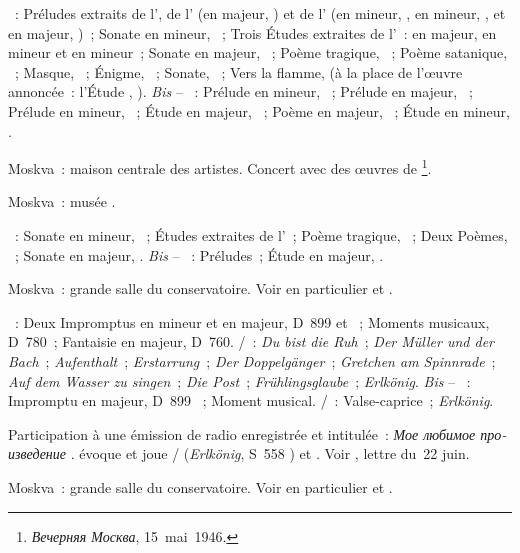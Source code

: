 \begin{description}
 \textsc{\Scriabine{}}~: Préludes extraits de l', de l'
 (en \kF \Sharp majeur, ) et de l' (en \kF mineur,
 , en \kB \Flat mineur, , et en \kD \Flat majeur,
 )~; Sonate en \kF \Sharp mineur, ~; Trois Études
 extraites de l'~:  en \kB majeur,  en \kB \Flat
 mineur et  en \kG \Sharp mineur~; Sonate en \kF \Sharp majeur,
 ~; Poème tragique, ~; Poème satanique, ~;
 Masque,  ~; Énigme,  ~; Sonate,
 ~; Vers la flamme,  (à la place de l'œuvre annoncée~:
 l'\hbox{Étude} ,  ).
 \emph{Bis} -- \textsc{\Scriabine{}}~: Prélude en \kG mineur, 
 ~; Prélude en \kE \Flat majeur,  ~; Prélude
 en \kE \Flat mineur,  ~; Étude en \kD \Flat majeur,
  ~; Poème en \kF \Sharp majeur,  ~;
 Étude en \kD \Sharp mineur,  .
 \item[\DateWithWeekDay{1946-05-17}]
 Moskva~: maison centrale des artistes.
 Concert avec des œuvres de \Scriabine{}%
 \footnote{\foreignlanguage{russian}{\emph{Вечерняя Москва}}, 15~mai~1946.}.
 \item[\DateWithWeekDay{1946-05-19}]
 Moskva~: musée \Scriabine{}.

 \textsc{\Scriabine{}}~: Sonate en \kF \Sharp mineur, ~; Études
 extraites de l'~; Poème tragique, ~; Deux Poèmes,
 ~; Sonate en \kF \Sharp majeur, .
 \emph{Bis} -- \textsc{\Scriabine{}}~: Préludes~; Étude en \kD \Flat majeur,
  .
 \item[\DateWithWeekDay{1946-05-23}]
 Moskva~: grande salle du conservatoire.
 Voir en particulier \citet[p.~442]{Milshteyn82a} et
 \citet[p.~394]{Nikonovich08}.

 \textsc{\Schubert{}}~: Deux Impromptus en \kC mineur et en \kA \Flat
 majeur, D~899  et ~; Moments musicaux, D~780~;
 Fantaisie  en \kC majeur, D~760.
 \textsc{\Schubert{}/\Liszt{}}~: \emph{Du bist die Ruh}~; \emph{Der Müller
 und der Bach}~; \emph{Aufenthalt}~; \emph{Erstarrung}~; \emph{Der
 Doppelgänger}~; \emph{Gretchen am Spinnrade}~; \emph{Auf dem Wasser zu
 singen}~; \emph{Die Post}~; \emph{Frühlingsglaube}~; \emph{Erlkönig}.
 \emph{Bis} -- \textsc{\Schubert{}}~: Impromptu en \kE \Flat majeur, D~899
 ~; Moment musical.
 \textsc{\Schubert{}/\Liszt{}}~: Valse-caprice~; \emph{Erlkönig}.
 \item[\DateWithWeekDay{1946-06-21}]
 Participation à une émission de radio enregistrée et intitulée~:
 \foreignlanguage{russian}{\emph{Мое любимое произведение}} .
 \VSofronitsky{} évoque et joue \Schubert{}/\Liszt{} (\emph{Erlkönig}, S~558
 ) et \Scriabine{}.
 Voir \citet[p.~167]{Nekrasova08}, lettre du~22 juin.
 \item[\DateWithWeekDay{1946-06-22}]
 Moskva~: grande salle du conservatoire.
 Voir en particulier \citet[p.~442]{Milshteyn82a} et
 \citet[p.~394-395]{Nikonovich08}.


\end{description}
